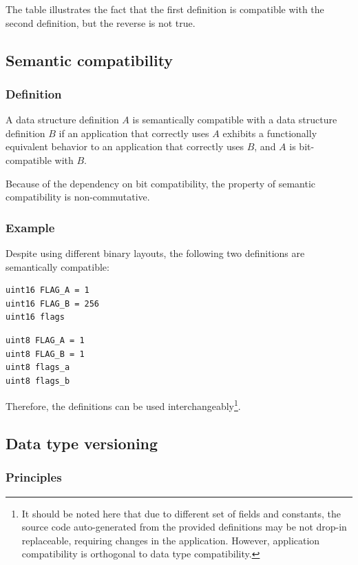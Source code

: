 The table illustrates the fact that the first definition is compatible with the second definition,
but the reverse is not true.

\subsection{Semantic compatibility}\label{sec:dsdl_semantic_compatibility}

\subsubsection{Definition}

A data structure definition $A$ is semantically compatible with a data structure definition $B$
if an application that correctly uses $A$ exhibits a functionally equivalent behavior to an application
that correctly uses $B$,
and $A$ is bit-compatible with $B$.

Because of the dependency on bit compatibility, the property of semantic compatibility is non-commutative.

\subsubsection{Example}

Despite using different binary layouts, the following two definitions are semantically compatible:

\begin{verbatim}
uint16 FLAG_A = 1
uint16 FLAG_B = 256
uint16 flags
\end{verbatim}

\begin{verbatim}
uint8 FLAG_A = 1
uint8 FLAG_B = 1
uint8 flags_a
uint8 flags_b
\end{verbatim}

Therefore, the definitions can be used
interchangeably\footnote{It should be noted here that due to different set of fields and constants,
the source code auto-generated from the provided definitions may be not drop-in replaceable,
requiring changes in the application. However, application compatibility is orthogonal to
data type compatibility.}.

\subsection{Data type versioning}

\subsubsection{Principles}

